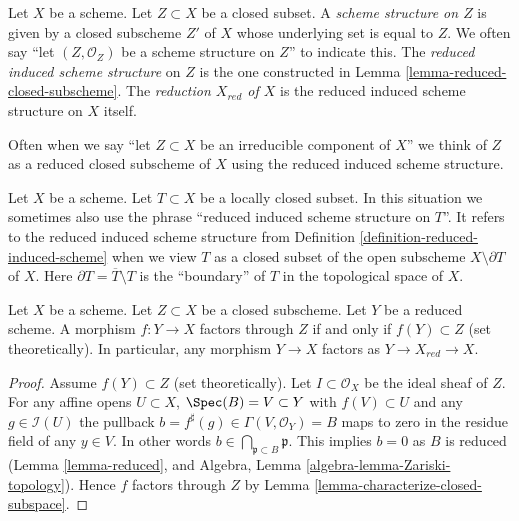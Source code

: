 \begin{definition}
\label{definition-reduced-induced-scheme}
Let $X$ be a scheme. Let $Z \subset X$ be a closed subset.
A {\it scheme structure on $Z$} is given by a closed subscheme $Z'$ of
$X$ whose underlying set is equal to $Z$. We often say
``let $(Z, \mathcal{O}_Z)$ be a scheme structure on $Z$'' to
indicate this. The {\it reduced induced scheme structure}
on $Z$ is the one constructed in Lemma \ref{lemma-reduced-closed-subscheme}.
The {\it reduction $X_{red}$ of $X$} is the reduced induced scheme
structure on $X$ itself.
\end{definition}

\noindent
Often when we say ``let $Z \subset X$ be an irreducible component of $X$''
we think of $Z$ as a reduced closed subscheme of $X$ using the reduced induced
scheme structure.

\begin{remark}
\label{remark-reduced-induced-locally-closed}
Let $X$ be a scheme. Let $T \subset X$ be a locally closed subset.
In this situation we sometimes also use the phrase
``reduced induced scheme structure on $T$''. It refers
to the reduced induced scheme structure from
Definition \ref{definition-reduced-induced-scheme}
when we view $T$ as a closed subset of the open subscheme 
$X \setminus \partial T$ of $X$. Here
$\partial T = \overline{T} \setminus T$ is the ``boundary'' of $T$
in the topological space of $X$.
\end{remark}

\begin{lemma}
\label{lemma-map-into-reduction}
Let $X$ be a scheme.
Let $Z \subset X$ be a closed subscheme.
Let $Y$ be a reduced scheme.
A morphism $f : Y \to X$ factors through $Z$ if and only if
$f(Y) \subset Z$ (set theoretically). In particular, any
morphism $Y \to X$ factors as $Y \to X_{red} \to X$.
\end{lemma}

\begin{proof}
Assume $f(Y) \subset Z$ (set theoretically).
Let $I \subset \mathcal{O}_X$ be the ideal sheaf of $Z$.
For any affine opens $U \subset X$, $\Spec(B) = V \subset Y$
with $f(V) \subset U$ and any $g \in \mathcal{I}(U)$
the pullback $b = f^\sharp(g) \in \Gamma(V, \mathcal{O}_Y) = B$
maps to zero in the residue field of any $y \in V$.
In other words $b \in \bigcap_{\mathfrak p \subset B} \mathfrak p$.
This implies $b = 0$ as $B$ is reduced (Lemma \ref{lemma-reduced}, and
Algebra, Lemma \ref{algebra-lemma-Zariski-topology}).
Hence $f$ factors through
$Z$ by Lemma \ref{lemma-characterize-closed-subspace}.
\end{proof}










